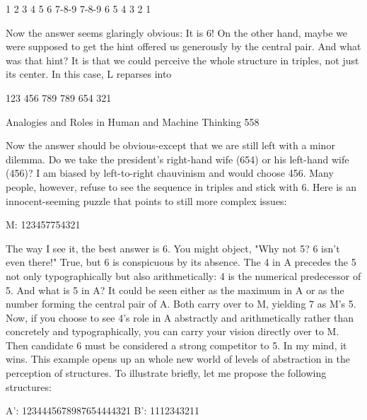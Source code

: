        1 2 3 4 5 6 7-8-9   7-8-9 6 5 4 3 2 1

Now the answer seems glaringly obvious: It is 6! On the other hand, maybe we were
supposed to get the hint offered us generously by the central pair. And what was that
hint? It is that we could perceive the whole structure in triples, not just its center. In
this case, L reparses into

       123 456 789 789 654 321




Analogies and Roles in Human and Machine Thinking                                      558

Now the answer should be obvious-except that we are still left with a minor dilemma.
Do we take the president's right-hand wife (654) or his left-hand wife (456)? I am
biased by left-to-right chauvinism and would choose 456. Many people, however,
refuse to see the sequence in triples and stick with 6.
        Here is an innocent-seeming puzzle that points to still more complex issues:

       M:    123457754321

The way I see it, the best answer is 6. You might object, "Why not 5? 6 isn't even
there!" True, but 6 is conspicuous by its absence. The 4 in A precedes the 5 not only
typographically but also arithmetically: 4 is the numerical predecessor of 5. And what
is 5 in A? It could be seen either as the maximum in A or as the number forming the
central pair of A. Both carry over to M, yielding 7 as M's 5. Now, if you choose to see
4's role in A abstractly and arithmetically rather than concretely and typographically,
you can carry your vision directly over to M. Then candidate 6 must be considered a
strong competitor to 5. In my mind, it wins.
        This example opens up an whole new world of levels of abstraction in the
perception of structures. To illustrate briefly, let me propose the following structures:

       A': 1234445678987654444321
       B’: 1112343211

